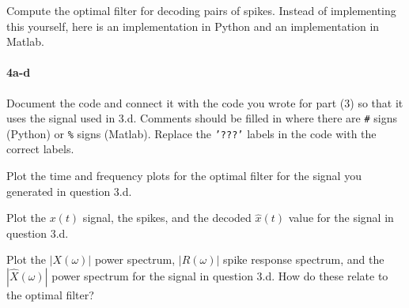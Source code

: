 \documentclass{article}
\begin{document}
Compute the optimal filter for decoding pairs of spikes. Instead of
implementing this yourself, here is an implementation in Python and an
implementation in Matlab.

    \paragraph{4a-d}\label{a-d}

Document the code and connect it with the code you wrote for part (3) so
that it uses the signal used in 3.d. Comments should be filled in where
there are \texttt{\#} signs (Python) or \texttt{\%} signs (Matlab).
Replace the \texttt{'???'} labels in the code with the correct labels.

Plot the time and frequency plots for the optimal filter for the signal
you generated in question 3.d.

Plot the $x(t)$ signal, the spikes, and the decoded $\hat{x}(t)$ value
for the signal in question 3.d.

Plot the $|X(\omega)|$ power spectrum, $|R(\omega)|$ spike response
spectrum, and the $|\hat{X}(\omega)|$ power spectrum for the signal in
question 3.d. How do these relate to the optimal filter?
\end{document}
